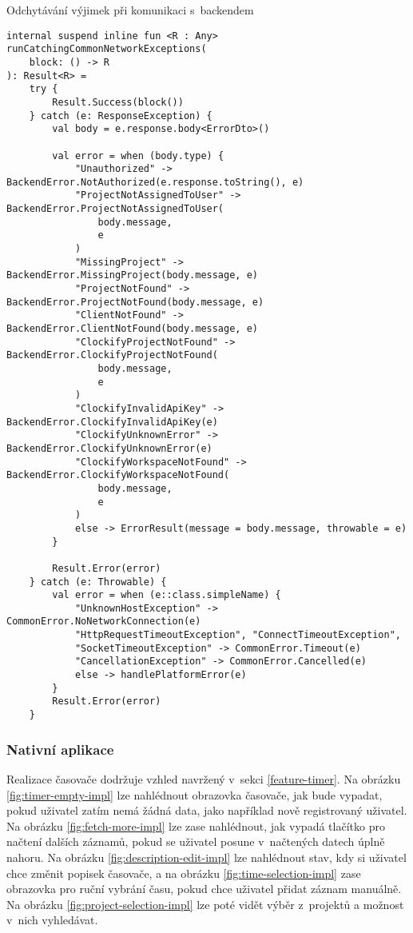 \begin{listing}
\caption{Odchytávání výjimek při komunikaci s~backendem}\label{code:kmp-run-catching-common-network-exceptions}
\begin{verbatim}
internal suspend inline fun <R : Any> runCatchingCommonNetworkExceptions(
    block: () -> R
): Result<R> =
    try {
        Result.Success(block())
    } catch (e: ResponseException) {
        val body = e.response.body<ErrorDto>()

        val error = when (body.type) {
            "Unauthorized" -> BackendError.NotAuthorized(e.response.toString(), e)
            "ProjectNotAssignedToUser" -> BackendError.ProjectNotAssignedToUser(
                body.message,
                e
            )
            "MissingProject" -> BackendError.MissingProject(body.message, e)
            "ProjectNotFound" -> BackendError.ProjectNotFound(body.message, e)
            "ClientNotFound" -> BackendError.ClientNotFound(body.message, e)
            "ClockifyProjectNotFound" -> BackendError.ClockifyProjectNotFound(
                body.message, 
                e
            )
            "ClockifyInvalidApiKey" -> BackendError.ClockifyInvalidApiKey(e)
            "ClockifyUnknownError" -> BackendError.ClockifyUnknownError(e)
            "ClockifyWorkspaceNotFound" -> BackendError.ClockifyWorkspaceNotFound(
                body.message,
                e
            )
            else -> ErrorResult(message = body.message, throwable = e)
        }

        Result.Error(error)
    } catch (e: Throwable) {
        val error = when (e::class.simpleName) {
            "UnknownHostException" -> CommonError.NoNetworkConnection(e)
            "HttpRequestTimeoutException", "ConnectTimeoutException",
            "SocketTimeoutException" -> CommonError.Timeout(e)
            "CancellationException" -> CommonError.Cancelled(e)
            else -> handlePlatformError(e)
        }
        Result.Error(error)
    }
\end{verbatim}
\end{listing}

\subsubsection{Nativní aplikace}

Realizace časovače dodržuje vzhled navržený v~sekci \ref{feature-timer}. Na obrázku \ref{fig:timer-empty-impl} lze nahlédnout obrazovka časovače, jak bude vypadat, pokud uživatel zatím nemá žádná data, jako například nově registrovaný uživatel. Na obrázku \ref{fig:fetch-more-impl} lze zase nahlédnout, jak vypadá tlačítko pro načtení dalších záznamů, pokud se uživatel posune v~načtených datech úplně nahoru. Na obrázku \ref{fig:description-edit-impl} lze nahlédnout stav, kdy si uživatel chce změnit popisek časovače, a na obrázku \ref{fig:time-selection-impl} zase obrazovka pro ruční vybrání času, pokud chce uživatel přidat záznam manuálně. Na obrázku \ref{fig:project-selection-impl} lze poté vidět výběr z~projektů a možnost v~nich vyhledávat.


